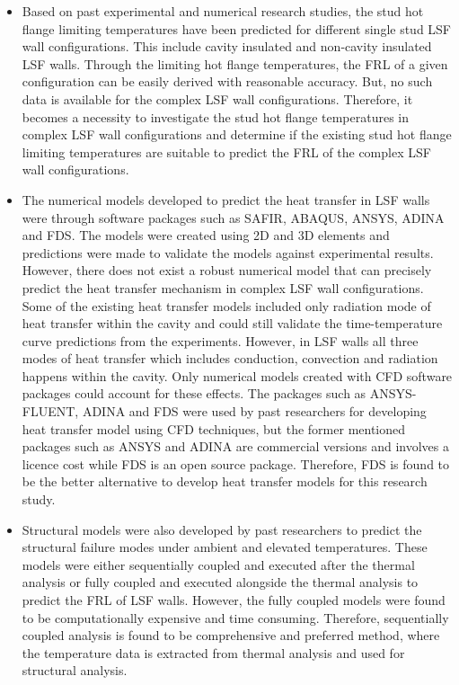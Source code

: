 \begin{itemize}
	\item Based on past experimental and numerical research studies, the stud hot flange limiting temperatures have been predicted for different single stud LSF wall configurations. This include cavity insulated and non-cavity insulated LSF walls. Through the limiting hot flange temperatures, the FRL of a given configuration can be easily derived with reasonable accuracy. But, no such data is available for the complex LSF wall configurations. Therefore, it becomes a necessity to investigate the stud hot flange temperatures in complex LSF wall configurations and determine if the existing stud hot flange limiting temperatures are suitable to predict the FRL of the complex LSF wall configurations. 
	\item The numerical models developed to predict the heat transfer in LSF walls were through software packages such as SAFIR, ABAQUS, ANSYS, ADINA and FDS. The models were created using 2D and 3D elements and predictions were made to validate the models against experimental results. However, there does not exist a robust numerical model that can precisely predict the heat transfer mechanism in complex LSF wall configurations. Some of the existing heat transfer models included only radiation mode of heat transfer within the cavity and could still validate the time-temperature curve predictions from the experiments. However, in LSF walls all three modes of heat transfer which includes conduction, convection and radiation happens within the cavity. Only numerical models created with CFD software packages could account for these effects. The packages such as ANSYS-FLUENT, ADINA and FDS were used by past researchers for developing heat transfer model using CFD techniques, but the former mentioned packages such as ANSYS and ADINA are commercial versions and involves a licence cost while FDS is an open source package. Therefore, FDS is found to be the better alternative to develop heat transfer models for this research study.
	\item Structural models were also developed by past researchers to predict the structural failure modes under ambient and elevated temperatures. These models were either sequentially coupled and executed after the thermal analysis or fully coupled and executed alongside the thermal analysis to predict the FRL of LSF walls. However, the fully coupled models were found to be computationally expensive and time consuming. Therefore, sequentially coupled analysis is found to be comprehensive and preferred method, where the temperature data is extracted from thermal analysis and used for structural analysis.

\end{itemize}

